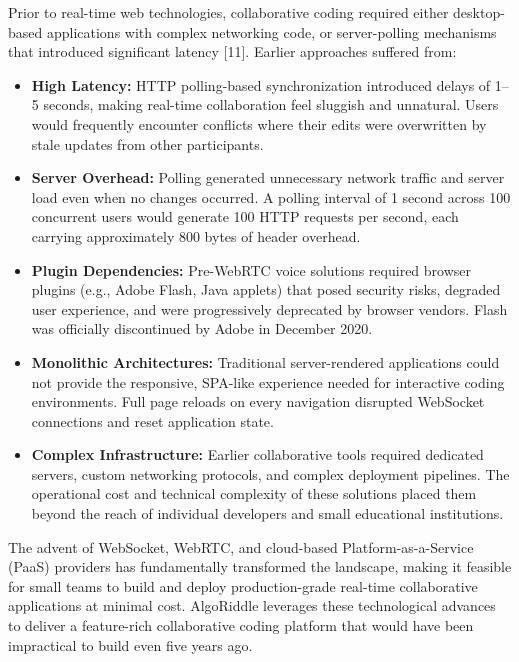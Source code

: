 Prior to real-time web technologies, collaborative coding required either desktop-based applications with complex networking code, or server-polling mechanisms that introduced significant latency [11]. Earlier approaches suffered from:

\begin{itemize}
    \item \textbf{High Latency:} HTTP polling-based synchronization introduced delays of 1--5 seconds, making real-time collaboration feel sluggish and unnatural. Users would frequently encounter conflicts where their edits were overwritten by stale updates from other participants.
    \item \textbf{Server Overhead:} Polling generated unnecessary network traffic and server load even when no changes occurred. A polling interval of 1 second across 100 concurrent users would generate 100 HTTP requests per second, each carrying approximately 800 bytes of header overhead.
    \item \textbf{Plugin Dependencies:} Pre-WebRTC voice solutions required browser plugins (e.g., Adobe Flash, Java applets) that posed security risks, degraded user experience, and were progressively deprecated by browser vendors. Flash was officially discontinued by Adobe in December 2020.
    \item \textbf{Monolithic Architectures:} Traditional server-rendered applications could not provide the responsive, SPA-like experience needed for interactive coding environments. Full page reloads on every navigation disrupted WebSocket connections and reset application state.
    \item \textbf{Complex Infrastructure:} Earlier collaborative tools required dedicated servers, custom networking protocols, and complex deployment pipelines. The operational cost and technical complexity of these solutions placed them beyond the reach of individual developers and small educational institutions.
\end{itemize}

The advent of WebSocket, WebRTC, and cloud-based Platform-as-a-Service (PaaS) providers has fundamentally transformed the landscape, making it feasible for small teams to build and deploy production-grade real-time collaborative applications at minimal cost. AlgoRiddle leverages these technological advances to deliver a feature-rich collaborative coding platform that would have been impractical to build even five years ago.
